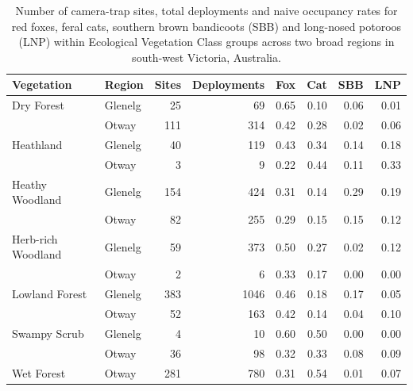 \documentclass[11pt,a4paper,titlepage,twoside,openright]{style/unimelbthesis}
\begin{document}
\begin{mainmatter}
\begingroup\fontsize{10}{12}\selectfont
\begin{longtable}[t]{llrrrrrr}
\caption{\label{tab:occ-naive}Number of camera-trap sites, total deployments and naive occupancy rates for red foxes, feral cats, southern brown bandicoots (SBB) and long-nosed potoroos (LNP) within Ecological Vegetation Class groups across two broad regions in south-west Victoria, Australia.}\\
\toprule
Vegetation & Region & Sites & Deployments & Fox & Cat & SBB & LNP\\
\midrule
Dry Forest & Glenelg & 25 & 69 & 0.65 & 0.10 & 0.06 & 0.01\\
 & Otway & 111 & 314 & 0.42 & 0.28 & 0.02 & 0.06\\
Heathland & Glenelg & 40 & 119 & 0.43 & 0.34 & 0.14 & 0.18\\
 & Otway & 3 & 9 & 0.22 & 0.44 & 0.11 & 0.33\\
Heathy Woodland & Glenelg & 154 & 424 & 0.31 & 0.14 & 0.29 & 0.19\\
\addlinespace
 & Otway & 82 & 255 & 0.29 & 0.15 & 0.15 & 0.12\\
Herb-rich Woodland & Glenelg & 59 & 373 & 0.50 & 0.27 & 0.02 & 0.12\\
 & Otway & 2 & 6 & 0.33 & 0.17 & 0.00 & 0.00\\
Lowland Forest & Glenelg & 383 & 1046 & 0.46 & 0.18 & 0.17 & 0.05\\
 & Otway & 52 & 163 & 0.42 & 0.14 & 0.04 & 0.10\\
\addlinespace
Swampy Scrub & Glenelg & 4 & 10 & 0.60 & 0.50 & 0.00 & 0.00\\
 & Otway & 36 & 98 & 0.32 & 0.33 & 0.08 & 0.09\\
Wet Forest & Otway & 281 & 780 & 0.31 & 0.54 & 0.01 & 0.07\\
\bottomrule
\end{longtable}
\endgroup{}

\newpage
\begin{figure}


\end{figure}
\end{mainmatter}
\end{document}
